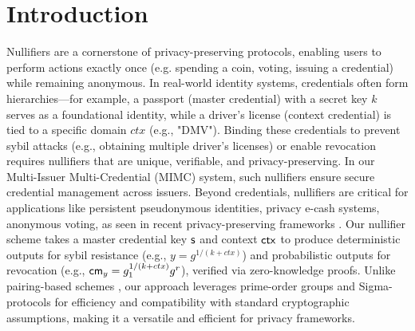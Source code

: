 \section{Introduction}\label{sec-vrf-introduction}
Nullifiers are a cornerstone of privacy-preserving protocols, enabling users to perform actions exactly once (e.g. spending a coin, voting, issuing a credential) while remaining anonymous. In real-world identity systems, credentials often form hierarchies—for example, a passport (master credential) with a secret key $k$ serves as a foundational identity, while a driver’s license (context credential) is tied to a specific domain $ctx$ (e.g., "DMV"). Binding these credentials to prevent sybil attacks (e.g., obtaining multiple driver’s licenses) or enable revocation requires nullifiers that are unique, verifiable, and privacy-preserving. In our Multi-Issuer Multi-Credential (MIMC) system, such nullifiers ensure secure credential management across issuers. Beyond credentials, nullifiers are critical for applications like persistent pseudonymous identities, privacy e-cash systems, anonymous voting, as seen in recent privacy-preserving frameworks \cite{gupta_plume_2022, goldberg_nsec5_2015, gurkan_community_2020, tomescu_utt_2022, ben_sasson_zerocash_2014}. Our nullifier scheme takes a master credential key $\mathsf{s}$ and context $\mathsf{ctx}$ to produce deterministic outputs for sybil resistance (e.g., $y = g^{1/(k + ctx)}$) and probabilistic outputs for revocation (e.g., $\mathsf{cm}_y = g_1^{1/(k + ctx)} g^r$), verified via zero-knowledge proofs. Unlike pairing-based schemes \cite{tomescu_utt_2022}, our approach leverages prime-order groups and Sigma-protocols for efficiency and compatibility with standard cryptographic assumptions, making it a versatile and efficient for privacy frameworks.

